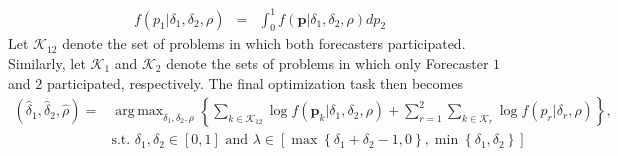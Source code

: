 \documentclass[11pt]{article}
\DeclareMathOperator*{\argmax}{arg\,max}
\theoremstyle{definition}
\theoremstyle{definition}
\begin{document}
\begin{eqnarray*}
 f\left(p_1 | \delta_1, \delta_2, \rho \right) &=& \int_0^1 f\left(\boldsymbol{p} | \delta_1, \delta_2, \rho \right) dp_2
\end{eqnarray*}
 Let $\mathcal{K}_{12}$ denote the set of problems in which both forecasters participated. Similarly, let $\mathcal{K}_1$ and $\mathcal{K}_2$ denote the sets of problems in which only Forecaster $1$ and $2$ participated, respectively. The final optimization task then becomes
\begin{align*}
\left(\hat{\delta}_1, \hat{\delta}_2, \hat{\rho}\right) =& \argmax_{\delta_1, \delta_2, \rho} \left\{ \sum_{k \in \mathcal{K}_{12}} \log  f\left(\boldsymbol{p}_k| \delta_1, \delta_2, \rho \right) +  \sum_{r = 1}^2 \sum_{k \in \mathcal{K}_{r}} \log  f\left(p_r| \delta_r, \rho \right)  \right\},\\
& \text{s.t. } \nonumber \delta_1, \delta_2 \in [0,1] \text{ and } \lambda \in \left[  \max \left\{\delta_1+\delta_2 - 1,  0\right\}, \min \left\{\delta_1, \delta_2 \right\} \right]
\end{align*}
\end{document}
